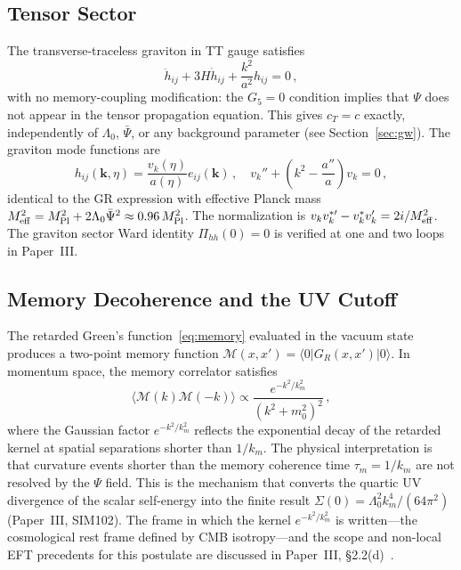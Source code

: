 \documentclass[12pt,a4paper]{article}
\newcommand{\Psibar}{\bar\Psi}
\newcommand{\Lz}{\Lambda_0}
\begin{document}
\subsection{Tensor Sector}
\label{sec:tensor-modes}

The transverse-traceless graviton in TT gauge satisfies
\begin{equation}
  \ddot h_{ij} + 3H\dot h_{ij} + \frac{k^2}{a^2}h_{ij} = 0\,,
\end{equation}
with no memory-coupling modification: the $G_5 = 0$ condition implies that
$\Psi$ does not appear in the tensor propagation equation. This gives
$c_T = c$ exactly, independently of $\Lz$, $\Psibar$, or any background
parameter (see Section~\ref{sec:gw}). The graviton mode functions are
\begin{equation}
  h_{ij}(\mathbf k, \eta) = \frac{v_k(\eta)}{a(\eta)} e_{ij}(\mathbf k)\,,
  \quad
  v_k'' + \left(k^2 - \frac{a''}{a}\right)v_k = 0\,,
\end{equation}
identical to the GR expression with effective Planck mass
$M_{\rm eff}^2 = M_{\rm Pl}^2 + 2\Lz\Psibar^2 \approx 0.96\,M_{\rm Pl}^2$.
The normalization is $v_k v_k^{*\prime} - v_k^*v_k' = 2i/M_{\rm eff}^2$.
The graviton sector Ward identity $\Pi_{hh}(0) = 0$ is verified
at one and two loops in Paper~III.

\subsection{Memory Decoherence and the UV Cutoff}
\label{sec:decoherence}

The retarded Green's function~\eqref{eq:memory} evaluated in the
vacuum state produces a two-point memory function
$\mathcal{M}(x, x') = \langle 0 | G_R(x,x') | 0 \rangle$. In momentum
space, the memory correlator satisfies
\begin{equation}
  \langle \mathcal{M}(k)\mathcal{M}(-k)\rangle
  \propto \frac{e^{-k^2/k_m^2}}{(k^2 + m_0^2)^2}\,,
\end{equation}
where the Gaussian factor $e^{-k^2/k_m^2}$ reflects the exponential decay
of the retarded kernel at spatial separations shorter than $1/k_m$. The
physical interpretation is that curvature events shorter than the memory
coherence time $\tau_m = 1/k_m$ are not resolved by the $\Psi$ field.
This is the mechanism that converts the quartic UV divergence of the
scalar self-energy into the finite result $\Sigma(0) = \Lz^2 k_m^4/(64\pi^2)$
(Paper~III, SIM102).
The frame in which the kernel $e^{-k^2/k_m^2}$ is written---the cosmological
rest frame defined by CMB isotropy---and the scope and non-local EFT precedents
for this postulate are discussed in Paper~III, \S2.2(d)~\cite{WilsonPaperIII}.
\end{document}
